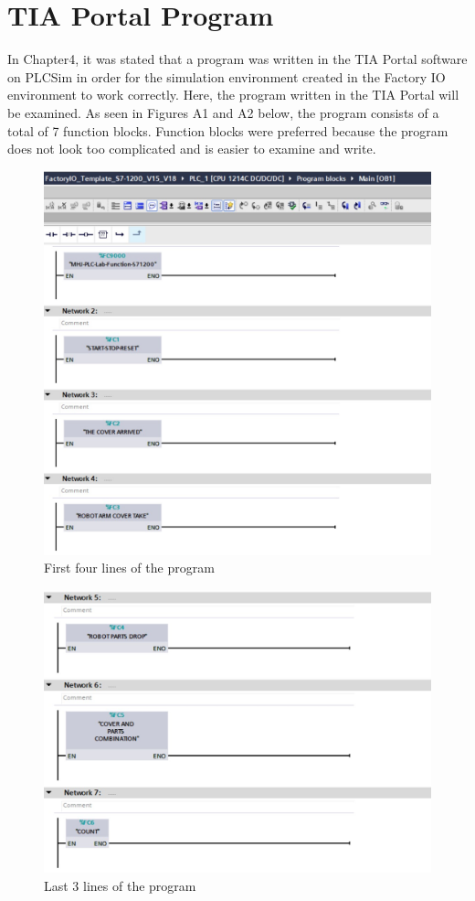 \doublespacing %

\chapter{TIA Portal Program}

\thesisspacing %

In Chapter4, it was stated that a program was written in the TIA Portal software on PLCSim in order for the simulation environment created in the Factory IO environment to work correctly.
Here, the program written in the TIA Portal will be examined. As seen in Figures A1 and A2 below, the program consists of a total of 7 function blocks. Function blocks were preferred because the program does not look too complicated and is easier to examine and write.
\begin{figure}[H]
    \centering
    \includegraphics[width=0.70\columnwidth]{imgs/io/tia1.jpg}
    \caption[First four lines of the program]{First four lines of the program}
    \label{fig-magnitude}
\end{figure}%
    \begin{figure}[H]
        \centering
        \includegraphics[width=0.70\columnwidth]{imgs/io/tia2.jpg}
        \caption[Last 3 lines of the program]{Last 3 lines of the program}
        \label{fig-magnitude}
    \end{figure}%
